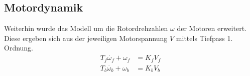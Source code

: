 \documentclass[times, 9pt,twocolumn]{article}
\begin{document}

	\subsection{Motordynamik}

	Weiterhin wurde das Modell um die Rotordrehzahlen $\omega$ der Motoren erweitert. Diese ergeben sich aus der jeweiligen Motorspannung $V$ mittels Tiefpass 1. Ordnung.
	\begin{align}
	T_f \dot{\omega_f} + \omega_f &= K_f V_f\\
	T_b \dot{\omega_b} + \omega_b &= K_b V_b
	\end{align}
\end{document}
